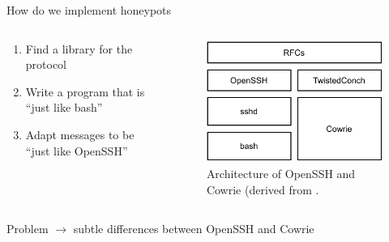 \begin{frame}{How do we implement honeypots}
    \begin{columns}[T]
        \begin{column}{0.5\textwidth}
                \begin{enumerate}
                \item Find a library for the protocol
                \item Write a program that is \enquote{just like bash}
                \item Adapt messages to be \enquote{just like OpenSSH}
            \end{enumerate}
        \end{column}
        \begin{column}{0.5\textwidth}
            \begin{figure}
                \centering
                \includegraphics[width=0.6\columnwidth]{img/cowrie-openssh.pdf}
                \caption[Architecture of OpenSSH and Cowrie]{
                    Architecture of OpenSSH and Cowrie (derived from \cite{vetterl2020}.
                }
            \end{figure}
        \end{column}
    \end{columns}
    \vfill
    \begin{center}
        Problem $\rightarrow$ subtle differences between OpenSSH and Cowrie
    \end{center}
\end{frame}

